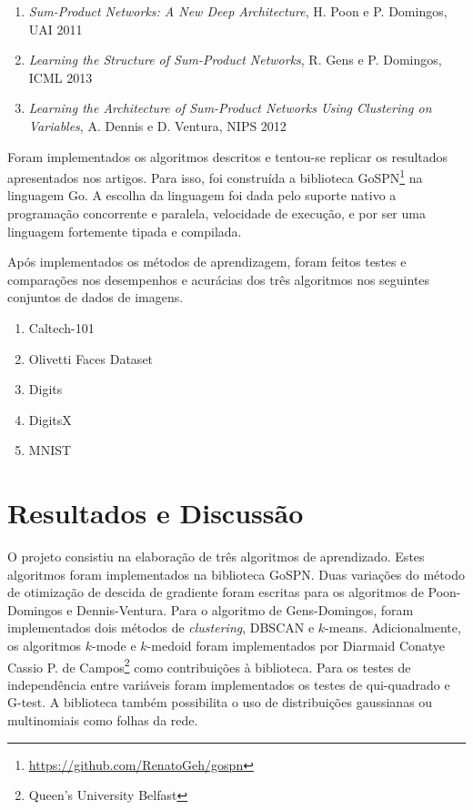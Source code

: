 \documentclass[12pt]{article}
\theoremstyle{plain}
\numberwithin{equation}{section}
\begin{document}
\begin{enumerate}
  \item \textit{Sum-Product Networks: A New Deep Architecture}, H. Poon e P. Domingos, UAI
    2011~\cite{poon-domingos}
  \item \textit{Learning the Structure of Sum-Product Networks}, R. Gens e P. Domingos, ICML
    2013~\cite{gens-domingos}
  \item \textit{Learning the Architecture of Sum-Product Networks Using Clustering on Variables},
    A. Dennis e D. Ventura, NIPS 2012~\cite{clustering}
\end{enumerate}

Foram implementados os algoritmos descritos e tentou-se replicar os resultados apresentados nos
artigos. Para isso, foi construída a biblioteca
GoSPN\footnote{\url{https://github.com/RenatoGeh/gospn}} na linguagem Go. A escolha da linguagem
foi dada pelo suporte nativo a programação concorrente e paralela, velocidade de execução, e por
ser uma linguagem fortemente tipada e compilada.

Após implementados os métodos de aprendizagem, foram feitos testes e comparações nos desempenhos e
acurácias dos três algoritmos nos seguintes conjuntos de dados de imagens.

\begin{enumerate}[label=\,(\alph*)]
  \item Caltech-101~\cite{caltech101}
  \item Olivetti Faces Dataset~\cite{olivetti}
  \item Digits~\cite{digits}
  \item DigitsX~\cite{digitsx}
  \item MNIST~\cite{mnist}
\end{enumerate}

\section{Resultados e Discussão}

O projeto consistiu na elaboração de três algoritmos de aprendizado. Estes algoritmos foram
implementados na biblioteca GoSPN\footnotemark[1]. Duas variações do método de otimização de
descida de gradiente foram escritas para os algoritmos de Poon-Domingos e Dennis-Ventura. Para o
algoritmo de Gens-Domingos, foram implementados dois métodos de \textit{clustering}, DBSCAN e
$k$-means. Adicionalmente, os algoritmos $k$-mode e $k$-medoid foram implementados por Diarmaid
Conaty\footnotemark[2] e Cassio P. de Campos\footnote{Queen's University Belfast} como
contribuições à biblioteca. Para os testes de independência entre variáveis foram implementados os
testes de qui-quadrado e G-test. A biblioteca também possibilita o uso de distribuições gaussianas
ou multinomiais como folhas da rede.
\end{document}
